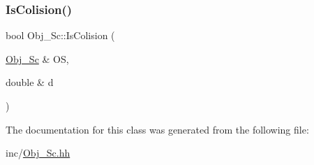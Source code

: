 \subsubsection{\texorpdfstring{Is\+Colision()}{IsColision()}}
{\footnotesize\ttfamily bool Obj\+\_\+\+Sc\+::\+Is\+Colision (\begin{DoxyParamCaption}\item[{\hyperlink{class_obj___sc}{Obj\+\_\+\+Sc} \&}]{OS,  }\item[{double \&}]{d }\end{DoxyParamCaption})}



The documentation for this class was generated from the following file\+:\begin{DoxyCompactItemize}
\item 
inc/\hyperlink{_obj___sc_8hh}{Obj\+\_\+\+Sc.\+hh}\end{DoxyCompactItemize}
